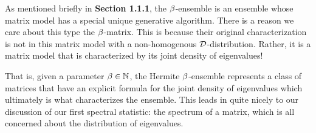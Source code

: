 As mentioned briefly in \textbf{Section 1.1.1}, the $\beta$-ensemble is an ensemble whose matrix model has a special unique generative algorithm. There is a reason we
care about this type the $\beta$-matrix. This is because their original characterization is not in this matrix model with a non-homogenous $\mathcal{D}$-distribution. Rather, it is
a matrix model that is characterized by its joint density of eigenvalues!

That is, given a parameter $\beta \in \mathbb{N}$, the Hermite $\beta$-ensemble represents a class of matrices that have an explicit formula for the joint density of eigenvalues which
ultimately is what characterizes the ensemble. This leads in quite nicely to our discussion of our first spectral statistic: the spectrum of a matrix, which is all concerned
about the distribution of eigenvalues.



\begin{center}
  \Ddisttable
\end{center}
